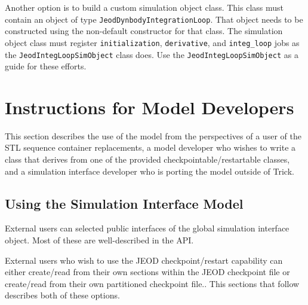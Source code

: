 Another option is to build a custom simulation object class.
This class must contain an object of type \verb|JeodDynbodyIntegrationLoop|.
That object needs to be constructed using the non-default constructor
for that class. The simulation object class must register
\verb|initialization|, \verb|derivative|, and \verb|integ_loop| jobs
as  the \verb|JeodIntegLoopSimObject| class does.
Use the \verb|JeodIntegLoopSimObject| as a guide for these efforts.

\section{Instructions for Model Developers}

This section describes the use of the model from the perspectives of
a user of the STL sequence container replacements,
a model developer who wishes to write a class that derives from
one of the provided checkpointable/restartable classes,
and a simulation interface developer who is porting the model outside of Trick.


\subsection{Using the Simulation Interface Model}
External users can selected public interfaces of the
global simulation interface object.
Most of these are well-described in the \ModelDesc API.

External users who wish to use the JEOD checkpoint/restart capability
can either
create/read from their own sections within the JEOD checkpoint file or
create/read from their own partitioned checkpoint file..
This sections that follow describes both of these options.

